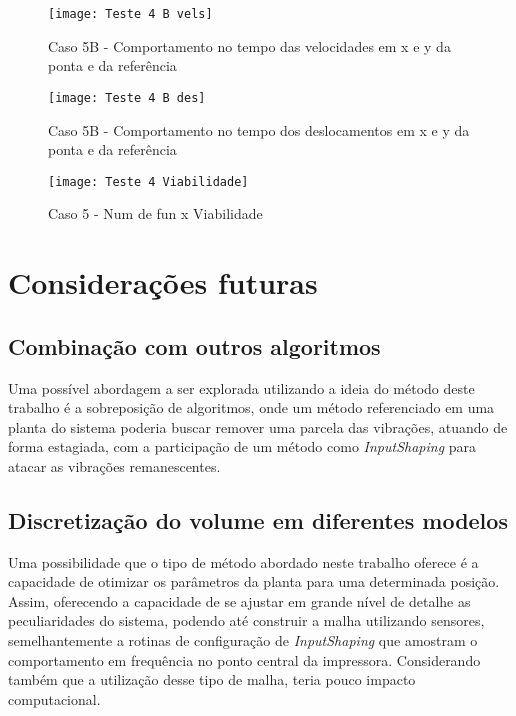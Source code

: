 \begin{figure}[H]
    \begin{center}
    \caption{Caso 5B - Comportamento no tempo das velocidades em x e y da ponta e da referência}
    \texttt{[image: Teste 4 B vels]}
    \label{fig:t_4b_vels}
    \end{center}
\end{figure}

\begin{figure}[H]
    \begin{center}
    \caption{Caso 5B - Comportamento no tempo dos deslocamentos em x e y da ponta e da referência}
    \texttt{[image: Teste 4 B des]}
    \label{fig:t_4b_des}
    \end{center}
\end{figure}

\begin{figure}[H]
    \begin{center}
    \caption{Caso 5 - Num de fun x Viabilidade}
    \texttt{[image: Teste 4 Viabilidade]}
    \label{fig:t_4_viab}
    \end{center}
\end{figure}

\section{Considerações futuras}
\subsection{Combinação com outros algoritmos}
Uma possível abordagem a ser explorada utilizando a ideia do método deste trabalho é a sobreposição de algoritmos, onde
um método referenciado em uma planta do sistema poderia buscar remover uma parcela das vibrações, atuando de forma estagiada,
com a participação de um método como \textit{InputShaping} para atacar as vibrações remanescentes.

\subsection{Discretização do volume em diferentes modelos}
Uma possibilidade que o tipo de método abordado neste trabalho oferece é a capacidade de otimizar os parâmetros da planta para uma determinada posição.
Assim, oferecendo a capacidade de se ajustar em grande nível de detalhe as peculiaridades do sistema, podendo até
construir a malha utilizando sensores, semelhantemente a rotinas de configuração de \textit{InputShaping} que amostram
o comportamento em frequência no ponto central da impressora. Considerando também que a utilização desse tipo de malha,
teria pouco impacto computacional.


